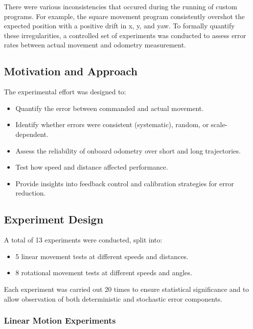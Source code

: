 \documentclass[a4paper, 12pt]{article}
\begin{document}
    There were various inconsistencies that occured during the running of custom programs. For example, the square movement program consistently overshot the expected position with a positive drift in x, y, and yaw. To formally quantify these irregularities, a controlled set of experiments was conducted to assess error rates between actual movement and odometry measurement.


    \subsection{Motivation and Approach}

    The experimental effort was designed to:
    \begin{itemize}[noitemsep]
        \item Quantify the error between commanded and actual movement.
        \item Identify whether errors were consistent (systematic), random, or scale-dependent.
        \item Assess the reliability of onboard odometry over short and long trajectories.
        \item Test how speed and distance affected performance.
        \item Provide insights into feedback control and calibration strategies for error reduction.
    \end{itemize}

    \subsection{Experiment Design}
    A total of 13 experiments were conducted, split into:
    \begin{itemize}[noitemsep]
        \item 5 linear movement tests at different speeds and distances.
        \item 8 rotational movement tests at different speeds and angles.
    \end{itemize}

    Each experiment was carried out 20 times to ensure statistical significance and to allow observation of both deterministic and stochastic error components.

    \subsubsection*{Linear Motion Experiments}
\end{document}
